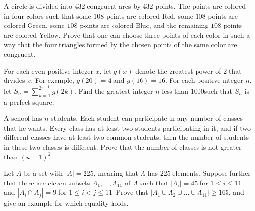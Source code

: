\documentclass{article}
\begin{document}
\begin{exercise}
A circle is divided into $432$ congruent arcs by $432$ points. The points are colored in four colors such that some $108$ points are colored Red, some $108$ points are colored Green, some $108$ points are colored Blue, and the remaining $108$ points are colored Yellow. Prove that one can choose three points of each color in such a way that the four triangles formed by the chosen points of the same color are congruent.
\end{exercise}

\begin{exercise}
For each even positive integer $x$, let $g(x)$ denote the greatest power of $2$ that divides $x$. For example, $g(20) = 4$ and $g(16) = 16$. For each positive integer $n$, let $S_n = \sum_{k=1}^{2^{n-1}}g(2k).$ Find the greatest integer $n$ less than $1000 $such that $S_n$ is a perfect square.
\end{exercise}

\begin{exercise}
A school has $n$ students. Each student can participate in any number of classes that he wants. Every class has at least two students participating in it, and if two different classes have at least two common students, then the number of students in these two classes is different. Prove that the number of classes is not greater than $(n - 1)^2$.
\end{exercise}

\begin{exercise}
Let $A$ be a set with $|A| = 225$, meaning that $A$ has $225$ elements. Suppose further that there are eleven subsets $A_1, \ldots, A_{11}$ of $A$ such that $|A_i| = 45$ for $1 \leq i \leq11$ and $|A_i \cap A_j| = 9$ for $1 \leq i < j \leq 11$. Prove that $|A_1 \cup A_2 \cup \ldots \cup A_{11}| \geq 165$, and give an example for which equality holds. 
\end{exercise}
\end{document}
